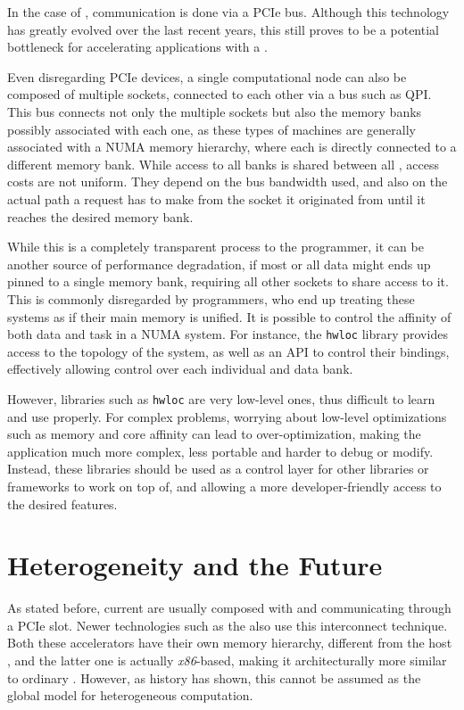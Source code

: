 \documentclass[main.tex]{subfiles}
\begin{document}
In the case of \gpus, communication is done via a \acs{PCIe} bus. Although this technology has greatly evolved over the last recent years, this still proves to be a potential bottleneck for accelerating applications with a \gpu.

Even disregarding \acs{PCIe} devices, a single computational node can also be composed of multiple \cpu sockets, connected to each other via a bus such as \ac{QPI}. This bus connects not only the multiple sockets but also the memory banks possibly associated with each one, as these types of machines are generally associated with a \acs{NUMA} memory hierarchy, where each \cpu is directly connected to a different memory bank. While access to all banks is shared between all \cpus, access costs are not uniform. They depend on the bus bandwidth used, and also on the actual path a request has to make from the socket it originated from until it reaches the desired memory bank.

While this is a completely transparent process to the programmer, it can be another source of performance degradation, if most or all data might ends up pinned to a single memory bank, requiring all other sockets to share access to it. This is commonly disregarded by programmers, who end up treating these systems as if their main memory is unified. It is possible to control the affinity of both data and task in a \acs{NUMA} system. For instance, the \texttt{hwloc}\cite{broquedis2010hwloc} library provides access to the topology of the system, as well as an API to control their bindings, effectively allowing control over each individual \cpu and data bank.

However, libraries such as \texttt{hwloc} are very low-level ones, thus difficult to learn and use properly. For complex problems, worrying about low-level optimizations such as memory and core affinity can lead to over-optimization, making the application much more complex, less portable and harder to debug or modify.
Instead, these libraries should be used as a control layer for other libraries or frameworks to work on top of, and allowing a more developer-friendly access to the desired features.

\section{Heterogeneity and the Future}

As stated before, current \hetplats are usually composed with \cpus and \gpus communicating through a \acs{PCIe} slot. Newer technologies such as the \intel \mic also use this interconnect technique. Both these accelerators have their own memory hierarchy, different from the host \cpu, and the latter one is actually \textit{x86}-based, making it architecturally more similar to ordinary \cpus. However, as history has shown, this cannot be assumed as the global model for heterogeneous computation.
\end{document}
